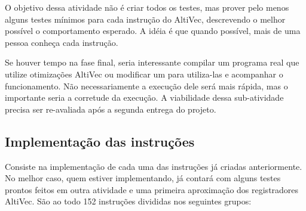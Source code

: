 \documentclass[twocolumn]{article}
\begin{document}
O objetivo dessa atividade não é criar todos os testes, mas prover pelo menos
alguns testes mínimos para cada instrução do AltiVec, descrevendo o melhor
possível o comportamento esperado. A idéia é que quando possível, mais de uma
pessoa conheça cada instrução.

Se houver tempo na fase final, seria interessante compilar um programa real que
utilize otimizações AltiVec ou modificar um para utiliza-las e acompanhar o
funcionamento. Não necessariamente a execução dele será mais rápida, mas o
importante seria a corretude da execução. A viabilidade dessa sub-atividade
precisa ser re-avaliada após a segunda entrega do projeto.


\subsection{Implementação das instruções}

Consiste na implementação de cada uma das instruções já criadas anteriormente.
No melhor caso, quem estiver implementando, já contará com alguns testes
prontos feitos em outra atividade e uma primeira aproximação dos registradores
AltiVec. São ao todo 152 instruções divididas nos seguintes grupos:
\end{document}
